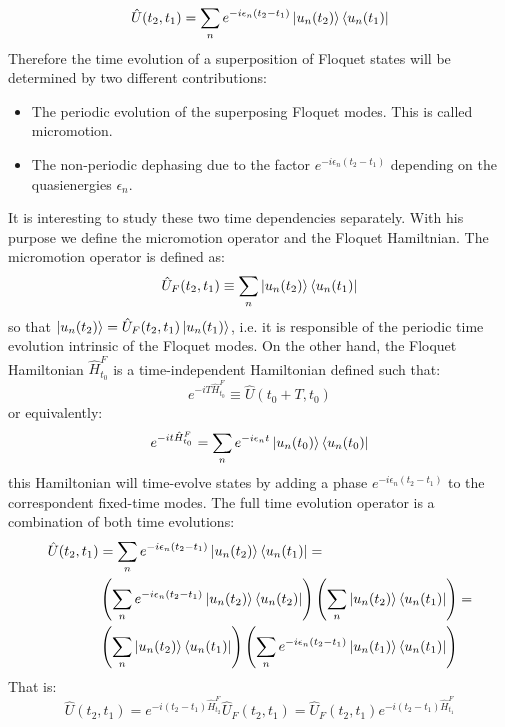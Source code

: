 \begin{equation}
\hat{U}(t_2,t_1) = \sum_n e^{-i\epsilon_n(t_2-t_1)}\ket{u_n(t_2)}\bra{u_n(t_1)}
\end{equation}
Therefore the time evolution of a superposition of Floquet states will be determined by two different contributions:

\begin{itemize}
\item The periodic evolution of the superposing Floquet modes. This is called micromotion.
\item The non-periodic dephasing due to the factor $e^{-i\epsilon_n(t_2-t_1)}$ depending on the quasienergies $\epsilon_n$.
\end{itemize} 
It is interesting to study these two time dependencies separately. With his purpose we define the micromotion operator and the Floquet Hamiltnian. The micromotion operator is defined as:
\begin{equation}
\hat{U}_F(t_2,t_1) \equiv \sum_n \ket{u_n(t_2)}\bra{u_n(t_1)}
\end{equation}
so that $\ket{u_n(t_2)} = \hat{U}_F(t_2,t_1)\ket{u_n(t_1)}$, i.e. it is responsible of the periodic time evolution intrinsic of the Floquet modes. On the other hand, the Floquet Hamiltonian $\hat{H}_{t_0}^F$ is a time-independent Hamiltonian defined such that:
\begin{equation}
e^{-iT\hat{H}_{t_0}^F} \equiv \hat{U}(t_0+T,t_0)
\end{equation}
or equivalently:
\begin{equation}
e^{-it\hat{H}_{t_0}^F} = \sum_n e^{-i\epsilon_nt}\ket{u_n(t_0)}\bra{u_n(t_0)}
\end{equation}
this Hamiltonian will time-evolve states by adding a phase $e^{-i\epsilon_n(t_2-t_1)}$ to the correspondent fixed-time modes. The full time evolution operator is a combination of both time evolutions:
\begin{align*}
\hat{U}(t_2,t_1) &= \sum_n e^{-i\epsilon_n(t_2-t_1)}\ket{u_n(t_2)}\bra{u_n(t_1)} = \\
&\left( \sum_n e^{-i\epsilon_n(t_2-t_1)}\ket{u_n(t_2)}\bra{u_n(t_2)} \right)\left( \sum_n\ket{u_n(t_2)}\bra{u_n(t_1)}\right) = \\
&\left( \sum_n \ket{u_n(t_2)}\bra{u_n(t_1)} \right)\left( \sum_n e^{-i\epsilon_n(t_2-t_1)}\ket{u_n(t_1)}\bra{u_n(t_1)} \right)
\end{align*}
That is:
\begin{equation}
\hat{U}(t_2,t_1) = e^{-i(t_2-t_1)\hat{H}_{t_2}^F}\hat{U}_F(t_2,t_1) = \hat{U}_F(t_2,t_1)e^{-i(t_2-t_1)\hat{H}_{t_1}^F}
\end{equation}

